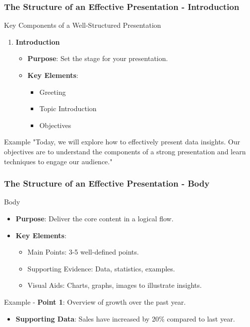 \documentclass[aspectratio=169]{beamer}
\begin{document}
\begin{frame}[fragile]
    \frametitle{The Structure of an Effective Presentation - Introduction}
    \begin{block}{Key Components of a Well-Structured Presentation}
        \begin{enumerate}
            \item \textbf{Introduction}
                \begin{itemize}
                    \item \textbf{Purpose}: Set the stage for your presentation.
                    \item \textbf{Key Elements}:
                        \begin{itemize}
                            \item Greeting
                            \item Topic Introduction
                            \item Objectives
                        \end{itemize}
                \end{itemize}
        \end{enumerate}
    \end{block}
    \begin{block}{Example}
        "Today, we will explore how to effectively present data insights. Our objectives are to understand the components of a strong presentation and learn techniques to engage our audience."
    \end{block}
\end{frame}

\begin{frame}[fragile]
    \frametitle{The Structure of an Effective Presentation - Body}
    \begin{block}{Body}
        \begin{itemize}
            \item \textbf{Purpose}: Deliver the core content in a logical flow.
            \item \textbf{Key Elements}:
                \begin{itemize}
                    \item Main Points: 3-5 well-defined points.
                    \item Supporting Evidence: Data, statistics, examples.
                    \item Visual Aids: Charts, graphs, images to illustrate insights.
                \end{itemize}
        \end{itemize}
    \end{block}
    \begin{block}{Example}
        - \textbf{Point 1}: Overview of growth over the past year.
            \begin{itemize}
                \item \textbf{Supporting Data}: Sales have increased by 20\% compared to last year.
            \end{itemize}
    \end{block}
\end{frame}
\end{document}
